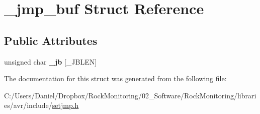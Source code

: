 \hypertarget{struct__jmp__buf}{}\section{\+\_\+jmp\+\_\+buf Struct Reference}
\label{struct__jmp__buf}
\subsection*{Public Attributes}
\begin{DoxyCompactItemize}
\item 
unsigned char {\bfseries \+\_\+jb} \mbox{[}\+\_\+\+J\+B\+L\+EN\mbox{]}\hypertarget{struct__jmp__buf_a85e480f76c9714e390645725e88e0165}{}\label{struct__jmp__buf_a85e480f76c9714e390645725e88e0165}

\end{DoxyCompactItemize}


The documentation for this struct was generated from the following file\+:\begin{DoxyCompactItemize}
\item 
C\+:/\+Users/\+Daniel/\+Dropbox/\+Rock\+Monitoring/02\+\_\+\+Software/\+Rock\+Monitoring/libraries/avr/include/\hyperlink{setjmp_8h}{setjmp.\+h}\end{DoxyCompactItemize}
